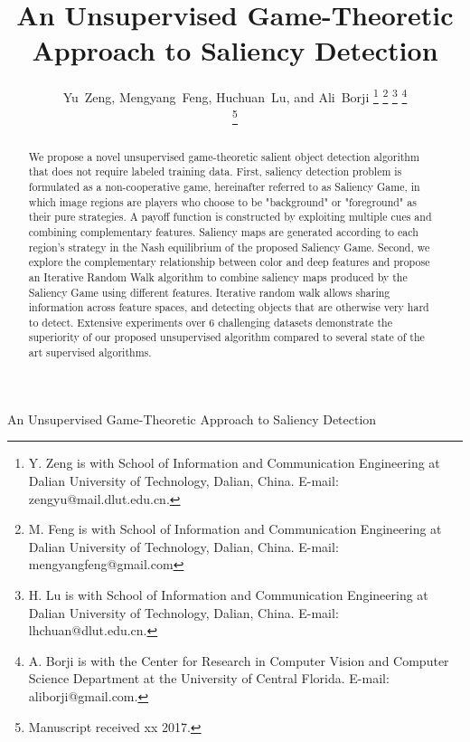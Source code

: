 \documentclass[journal]{IEEEtran}
\begin{document}
\title{An Unsupervised Game-Theoretic Approach to Saliency Detection}

\author{Yu~Zeng, Mengyang~Feng, Huchuan~Lu, and Ali~Borji
\thanks{Y. Zeng is with School of Information and Communication Engineering at Dalian University of Technology, Dalian, China. E-mail: zengyu@mail.dlut.edu.cn.}%
\thanks{M. Feng is with School of Information and Communication Engineering at Dalian University of Technology, Dalian, China. E-mail: mengyangfeng@gmail.com}%
\thanks{H. Lu is with School of Information and Communication Engineering at Dalian University of Technology, Dalian, China. E-mail: lhchuan@dlut.edu.cn. }%
\thanks{A. Borji is with the Center for Research in Computer Vision and Computer Science Department at the University of Central Florida. E-mail: aliborji@gmail.com. }%

\thanks{Manuscript received xx 2017.}%
}
%
{An Unsupervised Game-Theoretic Approach to Saliency Detection}
\maketitle
\begin{abstract}
We propose a novel unsupervised game-theoretic salient object detection algorithm that does not require labeled training data. First, saliency detection problem is formulated as a non-cooperative game, hereinafter referred to as Saliency Game, in which image regions are players who choose to be "background" or "foreground" as their pure strategies. A payoff function is constructed by exploiting multiple cues and combining complementary features. Saliency maps are generated according to each region's strategy in the Nash equilibrium of the proposed Saliency Game. Second, we explore the complementary relationship between color and deep features and propose an Iterative Random Walk algorithm to combine saliency maps produced by the Saliency Game using different features. Iterative random walk allows sharing information across feature spaces, and detecting objects that are otherwise very hard to detect. Extensive experiments over 6 challenging datasets demonstrate the superiority of our proposed unsupervised algorithm compared to several state of the art supervised algorithms. 
\end{abstract}
\end{document}
